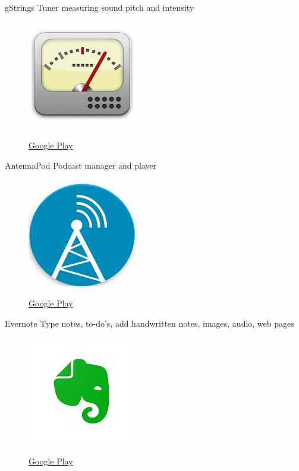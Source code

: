 \documentclass[serif,14pt,color=usenames,dvipsnames]{beamer}
\begin{document}
\begin{frame}{gStrings}
Tuner measuring sound pitch and intensity

  \begin{figure}
  \centering
  \includegraphics[width=0.4\linewidth]{imgs/gstrings}

  \href{https://play.google.com/store/apps/details?id=org.cohortor.gstrings.tyd}{Google
  Play }
  \end{figure}
\end{frame}

\begin{frame}{AntennaPod}
Podcast manager and player

  \begin{figure}
  \centering
  \includegraphics[width=0.4\linewidth]{imgs/antenna}

  \href{https://play.google.com/store/apps/details?id=de.danoeh.antennapod}{Google
  Play }
  \end{figure}
\end{frame}

\begin{frame}{Evernote}
  Type notes, to-do's, add handwritten notes, images, audio, web pages

  \begin{figure}
  \centering
  \includegraphics[width=0.4\linewidth]{imgs/evernote}

  \href{https://play.google.com/store/apps/details?id=com.evernote}{Google
  Play }
  \end{figure}
\end{frame}
\end{document}
